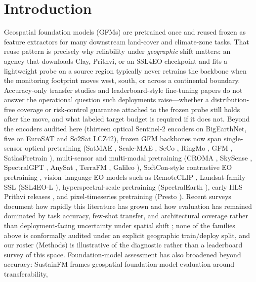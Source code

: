 \documentclass[preprint,11pt,authoryear]{elsarticle}
\begin{document}
\section{Introduction}\label{sec:intro}
Geospatial foundation models (GFMs) are pretrained once and reused frozen as feature extractors for many
downstream land-cover and climate-zone tasks. That reuse pattern is precisely why reliability under
\emph{geographic} shift matters: an agency that downloads Clay, Prithvi, or an SSL4EO checkpoint and fits a
lightweight probe on a source region typically never retrains the backbone when the monitoring footprint
moves west, south, or across a continental boundary. Accuracy-only transfer studies and leaderboard-style
fine-tuning papers do not answer the operational question such deployments raise---whether a distribution-free
coverage or risk-control guarantee attached to the frozen probe still holds after the move, and what labeled
target budget is required if it does not.
Beyond the encoders audited here (thirteen optical Sentinel-2 encoders on BigEarthNet, five on EuroSAT and
So2Sat LCZ42), frozen GFM backbones now span single-sensor optical pretraining
(SatMAE \citep{cong2022satmae}, Scale-MAE \citep{reed2023scalemae}, SeCo \citep{manas2021seasonal}, RingMo
\citep{sun2023ringmo}, GFM \citep{mendieta2023gfm}, SatlasPretrain \citep{bastani2023satlas}),
multi-sensor and multi-modal pretraining (CROMA
\citep{fuller2023croma}, SkySense \citep{guo2024skysense}, SpectralGPT \citep{hong2024spectralgpt}, AnySat
\citep{astruc2025anysat}, TerraFM \citep{danish2025terrafm}, Galileo \citep{tseng2025galileo}), SoftCon-style
contrastive EO pretraining \citep{wang2024softcon}, vision--language EO models such as RemoteCLIP
\citep{liu2024remoteclip}, Landsat-family SSL (SSL4EO-L \citep{stewart2023ssl4eol}), hyperspectral-scale
pretraining (SpectralEarth \citep{braham2024spectralearth}), early HLS Prithvi releases
\citep{jakubik2023prithvi}, and pixel-timeseries pretraining (Presto
\citep{tseng2023presto}). Recent surveys document how rapidly this literature has grown and how evaluation
has remained dominated by task accuracy, few-shot transfer, and architectural coverage rather than
deployment-facing uncertainty under spatial shift
\citep{xiao2025rsfm,lu2025visionfm,huo2025whenrs,yang2025multimodalgfm}; none of the families above is
conformally audited under an explicit geographic train/deploy split, and our roster (Methods) is illustrative
of the diagnostic rather than a leaderboard survey of this space. Foundation-model assessment has also
broadened beyond accuracy: SustainFM frames geospatial foundation-model evaluation around transferability,
\end{document}
